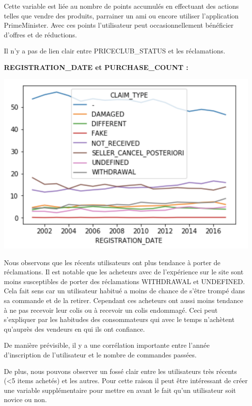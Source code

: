 Cette variable est liée au nombre de points accumulés en effectuant des actions telles que
vendre des produits, parrainer un ami ou encore utiliser l'application PrimeMinister.
Avec ces points l'utilisateur peut occasionnellement bénéficier d'offres et de réductions.

Il n'y a pas de lien clair entre PRICECLUB_STATUS et les réclamations.

\textbf{REGISTRATION_DATE et PURCHASE_COUNT :}

\begin{center}
\includegraphics[scale=0.5]{assets/registrationdate} 
\end{center}

Nous observons que les récents utilisateurs ont plus tendance à porter de réclamations.
Il est notable que les acheteurs avec de l'expérience sur le site sont moins susceptibles
de porter des réclamations WITHDRAWAL et UNDEFINED. Cela fait sens car un utilisateur 
habitué a moins de chance de s'être trompé dans sa commande et de la retirer.
Cependant ces acheteurs ont aussi moins tendance à ne pas recevoir leur colis ou à recevoir  
un colis endommagé. Ceci peut s'expliquer par les habitudes des consommateurs qui avec le 
temps n'achètent qu'auprès des vendeurs en qui ils ont confiance.

De manière prévisible, il y a une corrélation importante entre l'année d'inscription de
l'utilisateur et le nombre de commandes passées.

De plus, nous pouvons observer un fossé clair entre les utilisateurs très récents (<5 items 
achetés) et les autres. Pour cette raison il peut être intéressant de créer une variable
supplémentaire pour mettre en avant le fait qu'un utilisateur soit novice ou non.

